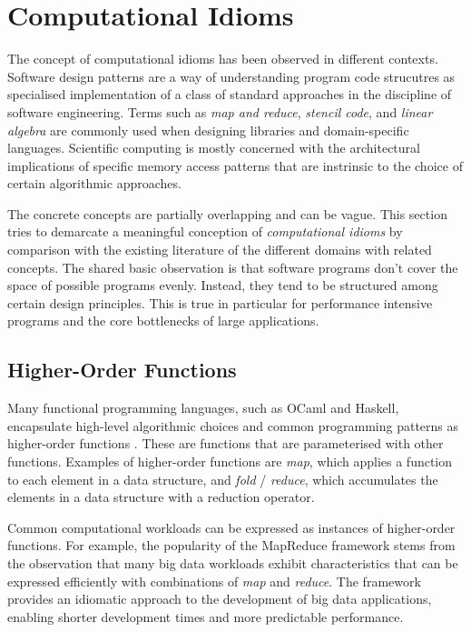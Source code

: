 \pagebreak
\section{Computational Idioms}

    The concept of computational idioms has been observed in different contexts.
    Software design patterns are a way of understanding program code
    strucutres as specialised implementation of a class of standard approaches
    in the discipline of software engineering.
    Terms such as {\em map and reduce}, {\em stencil code}, and
    {\em linear algebra} are commonly used when designing libraries and
    domain-specific languages.
    Scientific computing is mostly concerned with the architectural
    implications of specific memory access patterns that are instrinsic to
    the choice of certain algorithmic approaches.

    The concrete concepts are partially overlapping and can be vague.
    This section tries to demarcate a meaningful conception of
    {\it computational idioms} by comparison with the existing literature of the
    different domains with related concepts.
    The shared basic observation is that software programs don't cover the space
    of possible programs evenly.
    Instead, they tend to be structured among certain design principles.
    This is true in particular for performance intensive programs and the
    core bottlenecks of large applications.

\subsection{Higher-Order Functions}

    Many functional programming languages, such as OCaml and Haskell,
    encapsulate high-level algorithmic choices and common programming patterns
    as higher-order functions \citep{Hughes:1989:WFP:63410.63411}.
    These are functions that are parameterised with other functions.
    Examples of higher-order functions are {\it map}, which applies a function
    to each element in a data structure, and {\it fold} / {\it reduce}, which
    accumulates the elements in a data structure with a reduction operator.

    Common computational workloads can be expressed as instances of
    higher-order functions.
    For example, the popularity of the MapReduce framework
    \citep{Dean2008MapReduce} stems from the observation that many big data
    workloads exhibit characteristics that can be expressed efficiently with
    combinations of {\it map} and {\it reduce}.
    The framework provides an idiomatic approach to the development of big
    data applications, enabling shorter development times and more predictable
    performance.


